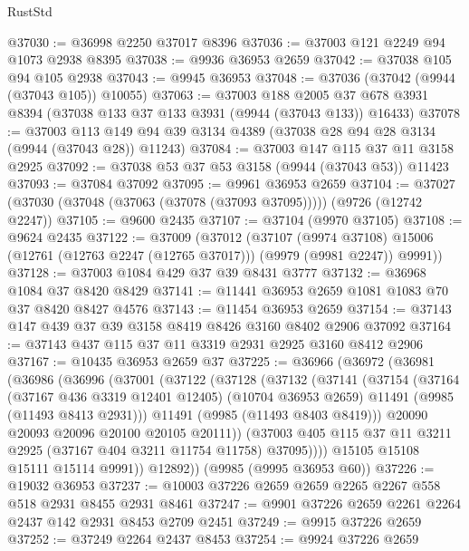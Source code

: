 \begin{lexlean}{RustStd}
\begin{coremodule}
@37030 := @36998 @2250 @37017 @8396
@37036 := @37003 @121 @2249 @94 @1073 @2938 @8395
@37038 := @9936 @36953 @2659
@37042 := @37038 @105 @94 @105 @2938
@37043 := @9945 @36953
@37048 := @37036 (@37042 (@9944 (@37043 @105)) @10055)
@37063 := @37003
    @188
    @2005
    @37
    @678
    @3931
    @8394
    (@37038 @133 @37 @133 @3931 (@9944 (@37043 @133)) @16433)
@37078 := @37003
    @113
    @149
    @94
    @39
    @3134
    @4389
    (@37038 @28 @94 @28 @3134 (@9944 (@37043 @28)) @11243)
@37084 := @37003 @147 @115 @37 @11 @3158 @2925
@37092 := @37038 @53 @37 @53 @3158 (@9944 (@37043 @53)) @11423
@37093 := @37084 @37092
@37095 := @9961 @36953 @2659
@37104 := @37027 (@37030 (@37048 (@37063 (@37078 (@37093 @37095))))) (@9726 (@12742 @2247))
@37105 := @9600 @2435
@37107 := @37104 (@9970 @37105)
@37108 := @9624 @2435
@37122 := @37009
    (@37012
      (@37107
        (@9974 @37108)
        @15006
        (@12761 (@12763 @2247 (@12765 @37017)))
        (@9979 (@9981 @2247))
        @9991))
@37128 := @37003 @1084 @429 @37 @39 @8431 @3777
@37132 := @36968 @1084 @37 @8420 @8429
@37141 := @11441 @36953 @2659 @1081 @1083 @70 @37 @8420 @8427 @4576
@37143 := @11454 @36953 @2659
@37154 := @37143 @147 @439 @37 @39 @3158 @8419 @8426 @3160 @8402 @2906 @37092
@37164 := @37143 @437 @115 @37 @11 @3319 @2931 @2925 @3160 @8412 @2906
@37167 := @10435 @36953 @2659 @37
@37225 := @36966
    (@36972
      (@36981
        (@36986
          (@36996
            (@37001
              (@37122
                (@37128
                  (@37132
                    (@37141
                      (@37154
                        (@37164
                          (@37167 @436 @3319 @12401 @12405)
                          (@10704 @36953 @2659)
                          @11491
                          (@9985 (@11493 @8413 @2931)))
                        @11491
                        (@9985 (@11493 @8403 @8419)))
                      @20090
                      @20093
                      @20096
                      @20100
                      @20105
                      @20111))
                  (@37003 @405 @115 @37 @11 @3211 @2925 (@37167 @404 @3211 @11754 @11758) @37095))))
            @15105
            @15108
            @15111
            @15114
            @9991))
        @12892))
    (@9985 (@9995 @36953 @60))
@37226 := @19032 @36953
@37237 := @10003 @37226 @2659 @2659 @2265 @2267 @558 @518 @2931 @8455 @2931 @8461
@37247 := @9901 @37226 @2659 @2261 @2264 @2437 @142 @2931 @8453 @2709 @2451
@37249 := @9915 @37226 @2659
@37252 := @37249 @2264 @2437 @8453
@37254 := @9924 @37226 @2659

\end{coremodule}
\end{lexlean}
